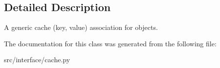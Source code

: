 \subsection{\-Detailed \-Description}
\begin{DoxyVerb}
A generic cache (key, value) association for objects.
\end{DoxyVerb}
 

\-The documentation for this class was generated from the following file\-:\begin{DoxyCompactItemize}
\item 
src/interface/cache.\-py\end{DoxyCompactItemize}
